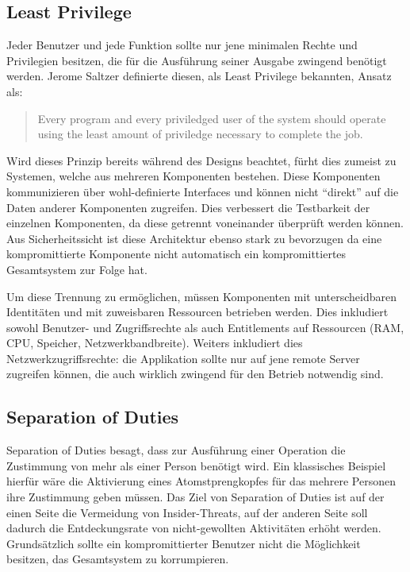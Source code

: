 \subsection{Least Privilege}

Jeder Benutzer und jede Funktion sollte nur jene minimalen Rechte und Privilegien besitzen, die für die Ausführung seiner Ausgabe zwingend benötigt werden. Jerome Saltzer definierte diesen, als Least Privilege bekannten, Ansatz als:

\begin{quote}
Every program and every priviledged user of the system should operate using the least amount of priviledge necessary to complete the job.
\end{quote}

Wird dieses Prinzip bereits während des Designs beachtet, fürht dies zumeist zu Systemen, welche aus mehreren Komponenten bestehen. Diese Komponenten kommunizieren über wohl-definierte Interfaces und können nicht ``direkt'' auf die Daten anderer Komponenten zugreifen. Dies verbessert die Testbarkeit der einzelnen Komponenten, da diese getrennt voneinander überprüft werden können. Aus Sicherheitssicht ist diese Architektur ebenso stark zu bevorzugen da eine kompromittierte Komponente nicht automatisch ein kompromittiertes Gesamtsystem zur Folge hat.

Um diese Trennung zu ermöglichen, müssen Komponenten mit unterscheidbaren Identitäten und mit zuweisbaren Ressourcen betrieben werden. Dies inkludiert sowohl Benutzer- und Zugriffsrechte als auch Entitlements auf Ressourcen (RAM, CPU, Speicher, Netzwerkbandbreite). Weiters inkludiert dies Netzwerkzugriffsrechte: die Applikation sollte nur auf jene remote Server zugreifen können, die auch wirklich zwingend für den Betrieb notwendig sind.

\subsection{Separation of Duties}

Separation of Duties besagt, dass zur Ausführung einer Operation die Zustimmung von mehr als einer Person benötigt wird. Ein klassisches Beispiel hierfür wäre die Aktivierung eines Atomstprengkopfes für das mehrere Personen ihre Zustimmung geben müssen. Das Ziel von Separation of Duties ist auf der einen Seite die Vermeidung von Insider-Threats, auf der anderen Seite soll dadurch die Entdeckungsrate von nicht-gewollten Aktivitäten erhöht werden. Grundsätzlich sollte ein kompromittierter Benutzer nicht die Möglichkeit besitzen, das Gesamtsystem zu korrumpieren.

